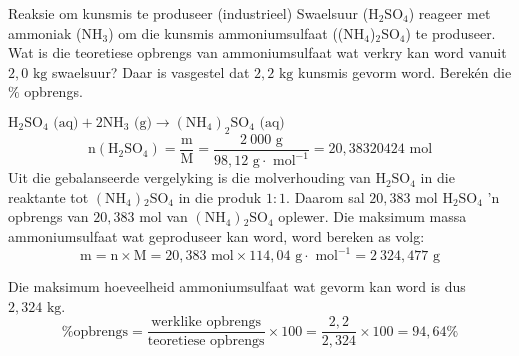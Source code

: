  \label{m38712*secfhsst!!!underscore!!!id2067}
      \noindent 
      \begin{wex}{Reaksie om kunsmis te produseer (industrieel) }
{
\label{m38712*probfhsst!!!underscore!!!id2068}
      \label{m38712*id284606}Swaelsuur ($\text{H}{}_{2}\text{SO}{}_{4}$) reageer met ammoniak ($\text{NH}{}_{3}$) om die kunsmis ammoniumsulfaat (($\text{NH}{}_{4}$)${}_{2}\text{SO}{}_{4}$) te produseer. Wat is die teoretiese opbrengs van ammoniumsulfaat wat verkry kan word vanuit $2,0 \text{ kg}$ swaelsuur? Daar is vasgestel dat $2,2 \text{ kg}$ kunsmis gevorm word. Berekén die $\%$ opbrengs. }
{
      \label{m38712*id284813}\nopagebreak\noindent{}
\label{m38712*id284690}${\text{H}}_{2}{\text{SO}}_{4} \text{ (aq)} + 2{\text{NH}}_{3}\text{ (g)} \to {({\text{NH}}_{4})}_{2}{\text{SO}}_{4}  \text{ (aq)}$
    \begin{equation*}
    \text{n} ({\text{H}}_{2}{\text{SO}}_{4}) = \frac{\text{m}}{\text{M}} = \frac{2~000 \text{ g}}{98,12 \text{ g} \cdot {\text{ mol}}^{-1}} = 20,38320424\text{ mol}
      \end{equation*}
      \label{m38712*id285156}Uit die gebalanseerde vergelyking is die molverhouding van $\text{H}{}_{2}\text{SO}{}_{4}$ in die reaktante tot $(\text{NH}{}_{4}){}_{2}\text{SO}{}_{4}$ in die produk $1:1$. Daarom sal $20,383 \text{ mol}$ $\text{H}{}_{2}\text{SO}{}_{4}$ 'n opbrengs van $20,383 \text{ mol}$ van $(\text{NH}{}_{4}){}_{2}\text{SO}{}_{4}$ oplewer. 
      \label{m38712*id285290}Die maksimum massa ammoniumsulfaat wat geproduseer kan word, word bereken as volg:
      \label{m38712*id285296}\nopagebreak\noindent{}
    \begin{equation*}
    \text{m}=\text{n} \times \text{M} = 20,383 \text{ mol} \times 114,04 \text{ g} \cdot {\text{ mol}}^{-1} = 2~324,477 \text{ g}
      \end{equation*}
      
      \label{m38712*id285362}Die maksimum hoeveelheid ammoniumsulfaat wat gevorm kan word is dus $2,324 \text{ kg}$.
\begin{equation*}
\text{\% opbrengs} = \frac{\text{werklike opbrengs}}{\text{teoretiese opbrengs}} \times 100 = \frac{2,2}{2,324} \times 100 = 94,64 \%\end{equation*}
}
    \end{wex}
\label{m38717*secfhsst!!!underscore!!!id695}


